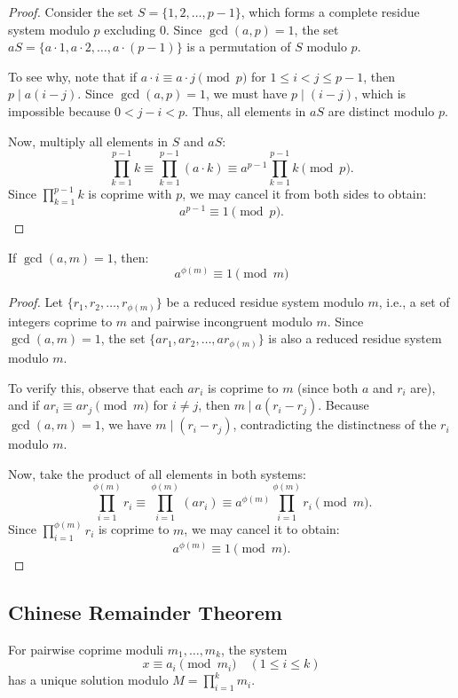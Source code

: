 \documentclass{scrartcl} %
\begin{document}
\begin{proof}
Consider the set $S = \{1, 2, \ldots, p-1\}$, which forms a complete residue system modulo $p$ excluding $0$. Since $\gcd(a, p) = 1$, the set $aS = \{a \cdot 1, a \cdot 2, \ldots, a \cdot (p-1)\}$ is a permutation of $S$ modulo $p$. 

To see why, note that if $a \cdot i \equiv a \cdot j \pmod{p}$ for $1 \leq i < j \leq p-1$, then $p \mid a(i-j)$. Since $\gcd(a, p) = 1$, we must have $p \mid (i-j)$, which is impossible because $0 < j-i < p$. Thus, all elements in $aS$ are distinct modulo $p$.

Now, multiply all elements in $S$ and $aS$:
\[
\prod_{k=1}^{p-1} k \equiv \prod_{k=1}^{p-1} (a \cdot k) \equiv a^{p-1} \prod_{k=1}^{p-1} k \pmod{p}.
\]
Since $\prod_{k=1}^{p-1} k$ is coprime with $p$, we may cancel it from both sides to obtain:
\[
a^{p-1} \equiv 1 \pmod{p}.
\]
\end{proof}
\newpage

\begin{theorem}\label{thm:eulerstheorem}
If $\gcd(a,m) = 1$, then:
\[ a^{\phi(m)} \equiv 1 \pmod{m} \]
\end{theorem}

\begin{proof}
Let $\{r_1, r_2, \ldots, r_{\phi(m)}\}$ be a reduced residue system modulo $m$, i.e., a set of integers coprime to $m$ and pairwise incongruent modulo $m$. Since $\gcd(a, m) = 1$, the set $\{a r_1, a r_2, \ldots, a r_{\phi(m)}\}$ is also a reduced residue system modulo $m$. 

To verify this, observe that each $a r_i$ is coprime to $m$ (since both $a$ and $r_i$ are), and if $a r_i \equiv a r_j \pmod{m}$ for $i \neq j$, then $m \mid a(r_i - r_j)$. Because $\gcd(a, m) = 1$, we have $m \mid (r_i - r_j)$, contradicting the distinctness of the $r_i$ modulo $m$.

Now, take the product of all elements in both systems:
\[
\prod_{i=1}^{\phi(m)} r_i \equiv \prod_{i=1}^{\phi(m)} (a r_i) \equiv a^{\phi(m)} \prod_{i=1}^{\phi(m)} r_i \pmod{m}.
\]
Since $\prod_{i=1}^{\phi(m)} r_i$ is coprime to $m$, we may cancel it to obtain:
\[
a^{\phi(m)} \equiv 1 \pmod{m}.
\]
\end{proof}

\subsection{Chinese Remainder Theorem}

\begin{theorem}\label{thm:chineseremaindertheorem}
For pairwise coprime moduli $m_1,\ldots,m_k$, the system
\[ x \equiv a_i \pmod{m_i} \quad (1 \leq i \leq k) \]
has a unique solution modulo $M = \prod_{i=1}^k m_i$.
\end{theorem}
\end{document}
